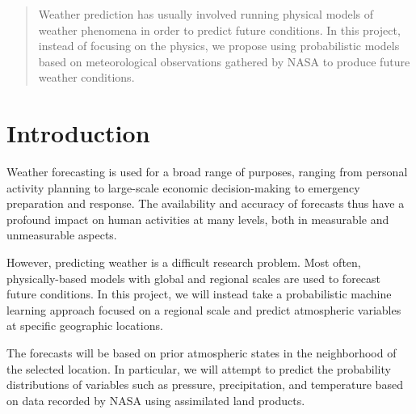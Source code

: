 \documentclass{article}
\begin{document}
 


\begin{abstract} 
Weather prediction has usually involved running physical models of weather
phenomena in order to predict future conditions. In this project, instead of
focusing on the physics, we propose using probabilistic models based on
meteorological observations gathered by NASA to produce future weather
conditions.
\end{abstract} 

\section{Introduction}
\label{submission}

Weather forecasting is used for a broad range of purposes, ranging from personal
activity planning to large-scale economic decision-making to emergency
preparation and response. The availability and accuracy of forecasts thus have a
profound impact on human activities at many levels, both in measurable and
unmeasurable aspects.

However, predicting weather is a difficult research problem. Most often,
physically-based models with global and regional scales are used to forecast
future conditions. In this project, we will instead take a probabilistic machine
learning approach focused on a regional scale and predict atmospheric variables
at specific geographic locations.

The forecasts will be based on prior atmospheric states in the neighborhood of
the selected location. In particular, we will attempt to predict the probability
distributions of variables such as pressure, precipitation, and temperature
based on data recorded by NASA using assimilated land products.
\end{document}
